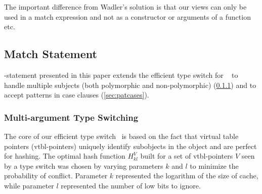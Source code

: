 The important difference from Wadler's solution is that our views can only be 
used in a match expression and not as a constructor or arguments of a function 
etc.

\subsection{Match Statement}
\label{sec:matchstmt}

-statement presented in this paper extends the efficient type switch 
for \Cpp{}~\cite{TS12} to handle 
multiple subjects (both polymorphic and non-polymorphic) 
(\textsection\ref{sec:multiarg}) and to accept patterns in 
case clauses (\textsection\ref{sec:patcases}).

\subsubsection{Multi-argument Type Switching}
\label{sec:multiarg}

The core of our efficient type switch~\cite{TS12} is based on the fact that 
virtual table pointers (vtbl-pointers) uniquely identify subobjects 
in the object and are perfect for hashing. The optimal 
hash function $H_{kl}^V$ built for a set of vtbl-pointers $V$ seen by a 
type switch was chosen by varying parameters $k$ and $l$ to minimize the 
probability of conflict. Parameter $k$ represented the logarithm of the 
size of cache, while parameter $l$ represented the number of low bits 
to ignore.


